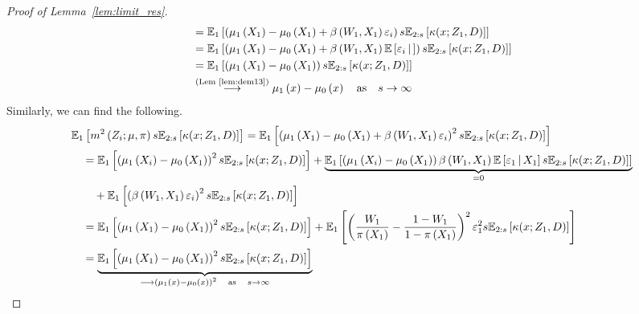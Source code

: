 \begin{proof}[Proof of Lemma~\ref{lem:limit_res}]
\begin{equation}
\begin{aligned}
			& = \mathbb{E}_{1}\left[\left(\mu_1\left(X_{1}\right) - \mu_0\left(X_{1}\right) + \beta\left(W_{1}, X_{1}\right)\varepsilon_{i}\right) s \mathbb{E}_{2:s}\left[\kappa(x; Z_1, D)\right]\right] \\
			& = \mathbb{E}_{1}\left[\left(\mu_1\left(X_{1}\right) - \mu_0\left(X_{1}\right) + \beta\left(W_{1}, X_{1}\right)\mathbb{E}\left[\varepsilon_{i} \, \middle| \, \right]\right) s \mathbb{E}_{2:s}\left[\kappa(x; Z_1, D)\right]\right] \\
			& = \mathbb{E}_{1}\left[\left(\mu_1\left(X_{1}\right) - \mu_0\left(X_{1}\right)\right) s \mathbb{E}_{2:s}\left[\kappa(x; Z_1, D)\right]\right] \\
			& \overset{\text{(Lem~\ref{lem:dem13})}}{\longrightarrow} \mu_1\left(x\right) - \mu_0\left(x\right)
			\quad \text{as} \quad s \rightarrow \infty
		\end{aligned}
	\end{equation}
	Similarly, we can find the following.
	\begin{equation}
		\begin{aligned}
			& \E_{1}\left[m^2\left(Z_{i}; \mu, \pi\right) s \E_{2:s}\left[\kappa(x; Z_1, D)\right]\right]
			= \E_{1}\left[\left(\mu_1\left(X_{1}\right) - \mu_0\left(X_{1}\right) + \beta\left(W_{1}, X_{1}\right)\varepsilon_{i}\right)^2 s \E_{2:s}\left[\kappa(x; Z_1, D)\right]\right] \\
			& \quad = \E_{1}\left[\left(\mu_1\left(X_{i}\right) - \mu_0\left(X_{1}\right)\right)^2 s \E_{2:s}\left[\kappa(x; Z_1, D)\right]\right]
			+ \underbrace{\E_{1}\left[\left(\mu_1\left(X_{i}\right) - \mu_0\left(X_{1}\right)\right)\beta\left(W_{1}, X_{1}\right)\E\left[\varepsilon_{1} \, \middle| \, X_1\right] s \E_{2:s}\left[\kappa(x; Z_1, D)\right]\right]}_{=0} \\
			& \quad \quad + \E_{1}\left[\left(\beta\left(W_{1}, X_{1}\right)\varepsilon_{i}\right)^2 s \E_{2:s}\left[\kappa(x; Z_1, D)\right]\right]\\
			& \quad =  \E_{1}\left[\left(\mu_1\left(X_{1}\right) - \mu_0\left(X_{1}\right)\right)^2 s \E_{2:s}\left[\kappa(x; Z_1, D)\right]\right]
			+ \E_{1}\left[\left(\frac{W_{1}}{\pi\left(X_1\right)} - \frac{1 - W_{1}}{1 - \pi\left(X_1\right)}\right)^2 \varepsilon_{1}^2 s \E_{2:s}\left[\kappa(x; Z_1, D)\right]\right]\\
			& \quad = \underbrace{\E_{1}\left[\left(\mu_1\left(X_{1}\right) - \mu_0\left(X_{1}\right)\right)^2 s \E_{2:s}\left[\kappa(x; Z_1, D)\right]\right]}_{\longrightarrow \left(\mu_1\left(x\right) - \mu_0\left(x\right)\right)^2 \quad \text{as} \quad s \rightarrow \infty}

\end{aligned}
\end{equation}
\end{proof}
